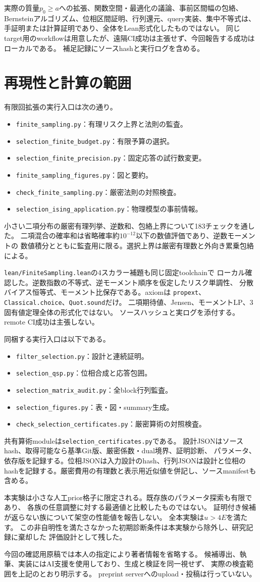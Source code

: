実際の質量$p_0\geq a$への拡張、関数空間・最適化の議論、事前区間幅の包絡、
Bernsteinアルゴリズム、位相区間証明、行列還元、query実装、集中不等式は、
手証明または計算証明であり、全体をLean形式化したものではない。
同じtarget用のworkflowは用意したが、遠隔CI成功は主張せず、今回報告する成功はローカルである。
補足記録にソースhashと実行ログを含める。

\section{再現性と計算の範囲}
有限回拡張の実行入口は次の通り。
\begin{itemize}
\item \texttt{finite\_sampling.py}：有理リスク上界と法則の監査。
\item \texttt{selection\_finite\_budget.py}：有限予算の選択。
\item \texttt{selection\_finite\_precision.py}：固定応答の試行数変更。
\item \texttt{finite\_sampling\_figures.py}：図と要約。
\item \texttt{check\_finite\_sampling.py}：厳密法則の対照検査。
\item \texttt{selection\_ising\_application.py}：物理模型の事前情報。
\end{itemize}
小さい二項分布の厳密有理列挙、逆数和、包絡上界について183チェックを通した。
二項混合の確率和は省略確率約$10^{-12}$以下の数値評価であり、逆数モーメントの
数値積分とともに監査用に限る。選択上界は厳密有理数と外向き累乗包絡による。

\texttt{lean/FiniteSampling.lean}の4スカラー補題も同じ固定toolchainで
ローカル確認した。逆数指数の不等式、逆モーメント順序を仮定したリスク単調性、
分散バイアス恒等式、モーメント比保存である。axiomは
\texttt{propext}、\texttt{Classical.choice}、\texttt{Quot.sound}だけ。
二項期待値、Jensen、モーメントLP、3固有値定理全体の形式化ではない。
ソースハッシュと実ログを添付する。remote CI成功は主張しない。

同梱する実行入口は以下である。
\begin{itemize}
\item \texttt{filter\_selection.py}：設計と連続証明。
\item \texttt{selection\_qsp.py}：位相合成と応答包囲。
\item \texttt{selection\_matrix\_audit.py}：全block行列監査。
\item \texttt{selection\_figures.py}：表・図・summary生成。
\item \texttt{check\_selection\_certificates.py}：厳密算術の対照検査。
\end{itemize}
共有算術moduleは\texttt{selection\_certificates.py}である。
設計JSONはソースhash、取得可能なら基準Git版、厳密係数・dual境界、証明診断、
パラメータ、依存版を記録する。位相JSONは入力設計のhash、行列JSONは設計と位相の
hashを記録する。厳密費用の有理数と表示用近似値を併記し、ソースmanifestも含める。

本実験は小さな人工prior格子に限定される。既存族のパラメータ探索も有限であり、
各族の任意調整に対する最適値と比較したものではない。
証明付き候補が返らない族について架空の性能値を報告しない。
全本実験は$u>4E$を満たす。
この非自明性を満たさなかった初期診断条件は本実験から除外し、研究記録に棄却した
評価設計として残した。

今回の確認用原稿では本人の指定により著者情報を省略する。
候補導出、執筆、実装にはAI支援を使用しており、生成と検証を同一視せず、
実際の検査範囲を上記のとおり明示する。
preprint serverへのupload・投稿は行っていない。
